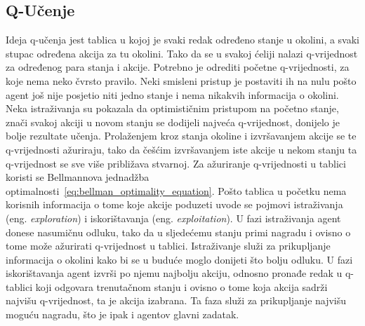 \subsection{Q-Učenje}
Ideja q-učenja jest tablica u kojoj je svaki redak određeno stanje u okolini, a svaki stupac određena akcija za tu okolini. Tako da se u svakoj ćeliji nalazi q-vrijednost za određenog para stanja i akcije. Potrebno je odrediti početne q-vrijednosti, za koje nema neko čvrsto pravilo. Neki smisleni pristup je postaviti ih na nulu pošto agent još nije posjetio niti jedno stanje i nema nikakvih informacija o okolini. Neka istraživanja su pokazala da optimističnim pristupom na početno stanje, znači svakoj akciji u novom stanju se dodijeli najveća q-vrijednost, donijelo je bolje rezultate učenja. Prolaženjem kroz stanja okoline i izvršavanjem akcije se te q-vrijednosti ažuriraju, tako da češćim izvršavanjem iste akcije u nekom stanju ta q-vrijednost se sve više približava stvarnoj. Za ažuriranje q-vrijednosti u tablici koristi se Bellmannova jednadžba optimalnosti~\ref{eq:bellman_optimality_equation}. Pošto tablica u početku nema korisnih informacija o tome koje akcije poduzeti uvode se pojmovi istraživanja (eng. \textit{exploration}) i iskorištavanja (eng. \textit{exploitation}). U fazi istraživanja agent donese nasumičnu odluku, tako da u sljedećemu stanju primi nagradu i ovisno o tome može ažurirati q-vrijednost u tablici. Istraživanje služi za prikupljanje informacija o okolini kako bi se u buduće moglo donijeti što bolju odluku. U fazi iskorištavanja agent izvrši po njemu najbolju akciju, odnosno pronađe redak u q-tablici koji odgovara trenutačnom stanju i ovisno o tome koja akcija sadrži najvišu q-vrijednost, ta je akcija izabrana. Ta faza služi za prikupljanje najvišu moguću nagradu, što je ipak i agentov glavni zadatak. 

